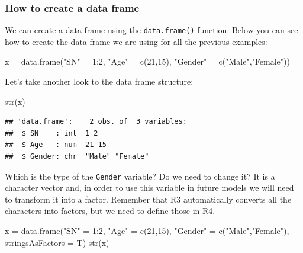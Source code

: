 \documentclass[
]{book}
\newenvironment{Shaded}{\begin{snugshade}}{\end{snugshade}}
\newcommand{\AttributeTok}[1]{\textcolor[rgb]{0.77,0.63,0.00}{#1}}
\newcommand{\DecValTok}[1]{\textcolor[rgb]{0.00,0.00,0.81}{#1}}
\newcommand{\FunctionTok}[1]{\textcolor[rgb]{0.00,0.00,0.00}{#1}}
\newcommand{\NormalTok}[1]{#1}
\newcommand{\OtherTok}[1]{\textcolor[rgb]{0.56,0.35,0.01}{#1}}
\newcommand{\SpecialCharTok}[1]{\textcolor[rgb]{0.00,0.00,0.00}{#1}}
\newcommand{\StringTok}[1]{\textcolor[rgb]{0.31,0.60,0.02}{#1}}
\begin{document}
\hypertarget{how-to-create-a-data-frame}{%
\subsubsection{How to create a data frame}\label{how-to-create-a-data-frame}}

We can create a data frame using the \texttt{data.frame()} function. Below you can see how to create the data frame we are using for all the previous examples:

\begin{Shaded}
\begin{Highlighting}[]
\NormalTok{x }\OtherTok{=} \FunctionTok{data.frame}\NormalTok{(}\StringTok{"SN"} \OtherTok{=} \DecValTok{1}\SpecialCharTok{:}\DecValTok{2}\NormalTok{, }\StringTok{"Age"} \OtherTok{=} \FunctionTok{c}\NormalTok{(}\DecValTok{21}\NormalTok{,}\DecValTok{15}\NormalTok{), }\StringTok{"Gender"} \OtherTok{=} \FunctionTok{c}\NormalTok{(}\StringTok{"Male"}\NormalTok{,}\StringTok{"Female"}\NormalTok{))}
\end{Highlighting}
\end{Shaded}

Let's take another look to the data frame structure:

\begin{Shaded}
\begin{Highlighting}[]
\FunctionTok{str}\NormalTok{(x)}
\end{Highlighting}
\end{Shaded}

\begin{verbatim}
## 'data.frame':    2 obs. of  3 variables:
##  $ SN    : int  1 2
##  $ Age   : num  21 15
##  $ Gender: chr  "Male" "Female"
\end{verbatim}

Which is the type of the \texttt{Gender} variable? Do we need to change it? It is a character vector and, in order to use this variable in future models we will need to transform it into a factor. Remember that R3 automatically converts all the characters into factors, but we need to define those in R4.

\begin{Shaded}
\begin{Highlighting}[]
\NormalTok{x }\OtherTok{=} \FunctionTok{data.frame}\NormalTok{(}\StringTok{"SN"} \OtherTok{=} \DecValTok{1}\SpecialCharTok{:}\DecValTok{2}\NormalTok{, }\StringTok{"Age"} \OtherTok{=} \FunctionTok{c}\NormalTok{(}\DecValTok{21}\NormalTok{,}\DecValTok{15}\NormalTok{), }\StringTok{"Gender"} \OtherTok{=} \FunctionTok{c}\NormalTok{(}\StringTok{"Male"}\NormalTok{,}\StringTok{"Female"}\NormalTok{), }\AttributeTok{stringsAsFactors =}\NormalTok{ T)}
\FunctionTok{str}\NormalTok{(x)}
\end{Highlighting}
\end{Shaded}
\end{document}
